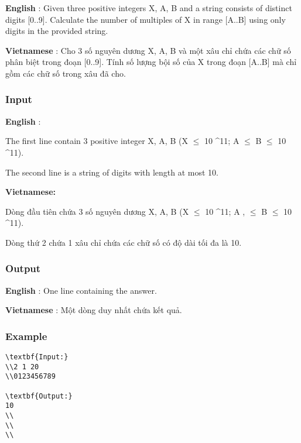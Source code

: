 



\textbf{    English   }   : Given three positive integers X, A, B and a string consists of distinct digits [0..9]. Calculate the number of multiples of X in range [A..B] using only digits in the provided string.  

\textbf{    Vietnamese   }   : Cho 3 số nguyên dương X, A, B và một xâu chỉ chứa các chữ số phân biệt trong đoạn [0..9]. Tính số lượng bội số của X trong đoạn [A..B] mà chỉ gồm các chữ số trong xâu đã cho.  

\subsubsection{   Input  }

\textbf{    English   }   :  

   The first line contain 3 positive integer X, A, B (X  $\le$  10 \textasciicircum 11; A  $\le$  B  $\le$  10 \textasciicircum 11).  

   The second line is a string of digits with length at most 10.  

\textbf{    Vietnamese:   }

   Dòng đầu tiên chứa 3 số nguyên dương X, A, B (X  $\le$  10 \textasciicircum 11; A , $\le$  B  $\le$  10 \textasciicircum 11).  

   Dòng thứ 2 chứa 1 xâu chỉ chứa các chữ số có độ dài tối đa là 10.  

\subsubsection{   Output  }

\textbf{    English   }   : One line containing the answer.  

\textbf{    Vietnamese   }   : Một dòng duy nhất chứa kết quả.  

\subsubsection{   Example  }
\begin{verbatim}
\textbf{Input:}
\\2 1 20
\\0123456789

\textbf{Output:}
10
\\
\\
\\\end{verbatim}
